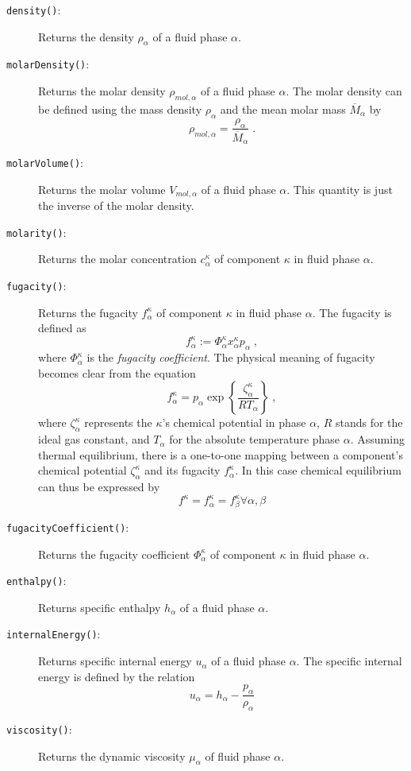 \begin{description}
\[  \]
\item[\texttt{density()}:] Returns the density $\rho_\alpha$ of a
  fluid phase $\alpha$.
\item[\texttt{molarDensity()}:] Returns the molar density
  $\rho_{mol,\alpha}$ of a fluid phase $\alpha$. The molar density can
  be defined using the mass density $\rho_\alpha$ and the mean molar mass $\overline M_\alpha$ by
  \[
  \rho_{mol,\alpha} = \frac{\rho_\alpha}{\overline M_\alpha} \;.
  \]
\item[\texttt{molarVolume()}:] Returns the molar volume
  $V_{mol,\alpha}$ of a fluid phase $\alpha$. This quantity is just
  the inverse of the molar density.
\item[\texttt{molarity()}:] Returns the molar concentration
  $c^\kappa_\alpha$ of component $\kappa$ in fluid
  phase $\alpha$.
\item[\texttt{fugacity()}:] Returns the fugacity $f^\kappa_\alpha$ of
  component $\kappa$ in fluid phase $\alpha$. The fugacity is defined
  as
  \[
  f_\alpha^\kappa := \Phi^\kappa_\alpha x^\kappa_\alpha p_\alpha \;,
  \]
  where $\Phi^\kappa_\alpha$ is the {\em fugacity coefficient}. The
  physical meaning of fugacity becomes clear from the equation
  \[
  f_\alpha^\kappa = p_\alpha \exp\left\{\frac{\zeta^\kappa_\alpha}{R T_\alpha} \right\} \;,
  \]
  where $\zeta^\kappa_\alpha$ represents the $\kappa$'s chemical
  potential in phase $\alpha$, $R$ stands for the
  ideal gas constant, and $T_\alpha$ for the absolute
  temperature phase $\alpha$. Assuming thermal equilibrium, there is a
  one-to-one mapping between a component's chemical potential
  $\zeta^\kappa_\alpha$ and its fugacity $f^\kappa_\alpha$. In this
  case chemical equilibrium can thus be expressed by
  \[
  f^\kappa = f^\kappa_\alpha = f^\kappa_\beta \forall \alpha, \beta
  \]
\item[\texttt{fugacityCoefficient()}:] Returns the fugacity coefficient $\Phi^\kappa_\alpha$ of
  component $\kappa$ in fluid phase $\alpha$.
\item[\texttt{enthalpy()}:] Returns specific enthalpy $h_\alpha$ of a
  fluid phase $\alpha$. 
\item[\texttt{internalEnergy()}:] Returns specific internal energy $u_\alpha$ of a
  fluid phase $\alpha$. The specific internal energy is defined by the relation
  \[
  u_\alpha = h_\alpha - \frac{p_\alpha}{\rho_\alpha}
  \]
\item[\texttt{viscosity()}:] Returns the dynamic viscosity
  $\mu_\alpha$ of fluid phase $\alpha$.
\end{description}
  
